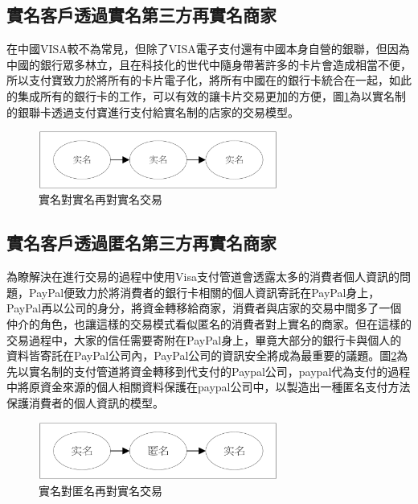 

		\subsection{實名客戶透過實名第三方再實名商家}
		在中國VISA較不為常見，但除了VISA電子支付還有中國本身自營的銀聯，但因為中國的銀行眾多林立，且在科技化的世代中隨身帶著許多的卡片會造成相當不便，所以支付寶致力於將所有的卡片電子化，將所有中國在的銀行卡統合在一起，如此的集成所有的銀行卡的工作，可以有效的讓卡片交易更加的方便，圖\ref{modennn}為以實名制的銀聯卡透過支付寶進行支付給實名制的店家的交易模型。

		\begin{figure}[h]
			\centering
			\includegraphics[width = 0.7\textwidth]{modennn.png}
			\caption{實名對實名再對實名交易}\label{modennn}
		\end{figure}


		\subsection{實名客戶透過匿名第三方再實名商家}
		為瞭解決在進行交易的過程中使用Visa支付管道會透露太多的消費者個人資訊的問題，PayPal便致力於將消費者的銀行卡相關的個人資訊寄託在PayPal身上，PayPal再以公司的身分，將資金轉移給商家，消費者與店家的交易中間多了一個仲介的角色，也讓這樣的交易模式看似匿名的消費者對上實名的商家。但在這樣的交易過程中，大家的信任需要寄附在PayPal身上，畢竟大部分的銀行卡與個人的資料皆寄託在PayPal公司內，PayPal公司的資訊安全將成為最重要的議題。圖\ref{modenan}為先以實名制的支付管道將資金轉移到代支付的Paypal公司，paypal代為支付的過程中將原資金來源的個人相關資料保護在paypal公司中，以製造出一種匿名支付方法保護消費者的個人資訊的模型。

		\begin{figure}[h]
			\centering
			\includegraphics[width = 0.7\textwidth]{modenan.png}
			\caption{實名對匿名再對實名交易}\label{modenan}
		\end{figure}



